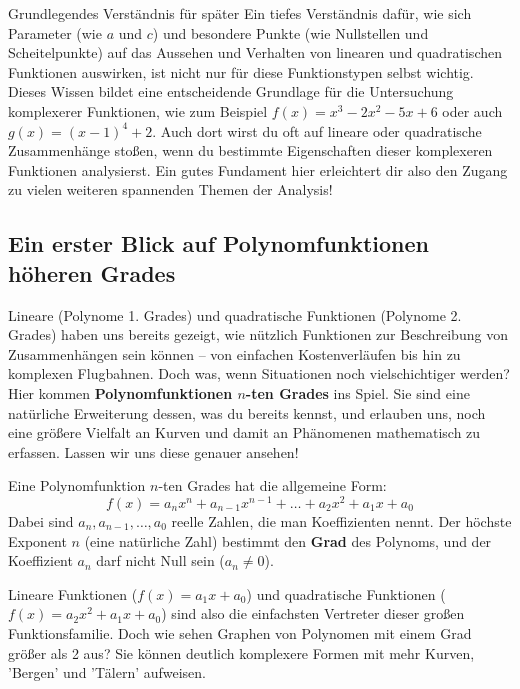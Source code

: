 \begin{warumwichtigumgebung}{Grundlegendes Verständnis für später}
Ein tiefes Verständnis dafür, wie sich Parameter (wie $a$ und $c$) und besondere Punkte (wie Nullstellen und Scheitelpunkte) auf das Aussehen und Verhalten von linearen und quadratischen Funktionen auswirken, ist nicht nur für diese Funktionstypen selbst wichtig. Dieses Wissen bildet eine entscheidende Grundlage für die Untersuchung komplexerer Funktionen, wie zum Beispiel $f(x)=x^3-2x^2-5x+6$ oder auch $g(x)=(x-1)^4+2$. Auch dort wirst du oft auf lineare oder quadratische Zusammenhänge stoßen, wenn du bestimmte Eigenschaften dieser komplexeren Funktionen analysierst. Ein gutes Fundament hier erleichtert dir also den Zugang zu vielen weiteren spannenden Themen der Analysis! \smiley{}
\end{warumwichtigumgebung}








\subsection{Ein erster Blick auf Polynomfunktionen höheren Grades}
\label{sec:polynome_n_ten_grades}

Lineare (Polynome 1. Grades) und quadratische Funktionen (Polynome 2. Grades) haben uns bereits gezeigt, wie nützlich Funktionen zur Beschreibung von Zusammenhängen sein können – von einfachen Kostenverläufen bis hin zu komplexen Flugbahnen. Doch was, wenn Situationen noch vielschichtiger werden? Hier kommen \textbf{Polynomfunktionen $n$-ten Grades} ins Spiel. Sie sind eine natürliche Erweiterung dessen, was du bereits kennst, und erlauben uns, noch eine größere Vielfalt an Kurven und damit an Phänomenen mathematisch zu erfassen. Lassen wir uns diese genauer ansehen!


Eine Polynomfunktion $n$-ten Grades hat die allgemeine Form:
\[ f(x) = a_n x^n + a_{n-1} x^{n-1} + \dots + a_2 x^2 + a_1 x + a_0 \]
Dabei sind $a_n, a_{n-1}, \dots, a_0$ reelle Zahlen, die man Koeffizienten nennt. Der höchste Exponent $n$ (eine natürliche Zahl) bestimmt den \textbf{Grad} des Polynoms, und der Koeffizient $a_n$ darf nicht Null sein ($a_n \neq 0$).

Lineare Funktionen ($f(x)=a_1x+a_0$) und quadratische Funktionen ($f(x)=a_2x^2+a_1x+a_0$) sind also die einfachsten Vertreter dieser großen Funktionsfamilie. Doch wie sehen Graphen von Polynomen mit einem Grad größer als 2 aus? Sie können deutlich komplexere Formen mit mehr Kurven, 'Bergen' und 'Tälern' aufweisen.

